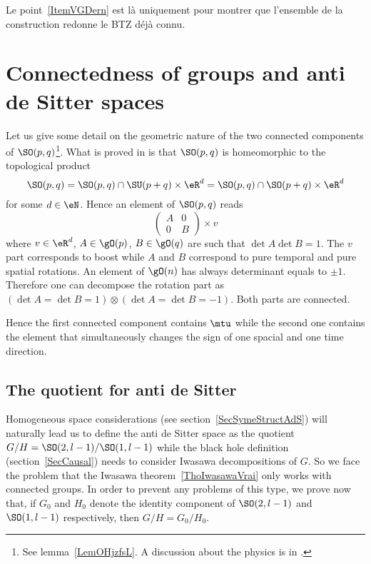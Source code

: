 Le point~\ref{ItemVGDern} est là uniquement pour montrer que l'ensemble de la construction redonne le BTZ déjà connu.

\section{Connectedness of groups and anti de Sitter spaces}

\label{PgDisGeoConnSO}Let us give some detail on the geometric nature of the two connected components of $\SO(p,q)$\footnote{See lemma~\ref{LemOHjzfsL}. A discussion about the physics is in \cite{Schomblond_em}.}. What is proved in \cite{HelgasonSym} is that $\SO(p,q)$ is homeomorphic to the topological product
\[
  \SO(p,q)=\SO(p,q)\cap\SU(p+q)\times \eR^{d}=\SO(p,q)\cap\SO(p+q)\times \eR^{d}
\]
for some $d\in\eN$. Hence an element of $\SO(p,q)$ reads
\[
  \begin{pmatrix}
A&0\\
0&B
\end{pmatrix}\times v
\]
where $v\in\eR^{d}$, $A\in \gO(p)$, $B\in\gO(q)$ are such that $\det A\det B=1$. The $v$ part corresponds to boost while $A$ and $B$ correspond to pure temporal and pure spatial rotations. An element of $\gO(n)$ has always determinant equals to $\pm 1$. Therefore one can decompose the rotation part as $(\det A=\det B=1)\otimes (\det A=\det B=-1)$. Both parts are connected.

Hence the first connected component contains $\mtu$ while the second one contains the element that simultaneously changes the sign of one spacial and one time direction.

\subsection{The quotient for anti de Sitter}

Homogeneous space considerations (see section~\ref{SecSymeStructAdS}) will naturally lead us to define the anti de Sitter space as the quotient $G/H=\SO(2,l-1)/\SO(1,l-1)$ while the black hole definition (section~\ref{SecCausal}) needs to consider Iwasawa decompositions of $G$. So we face the problem that the Iwasawa theorem~\ref{ThoIwasawaVrai} only works with connected groups. In order to prevent any problems of this type, we prove now that, if $G_0$ and $H_0$ denote the identity component of $\SO(2,l-1)$ and $\SO(1,l-1)$ respectively, then $G/H=G_0/H_0$.

